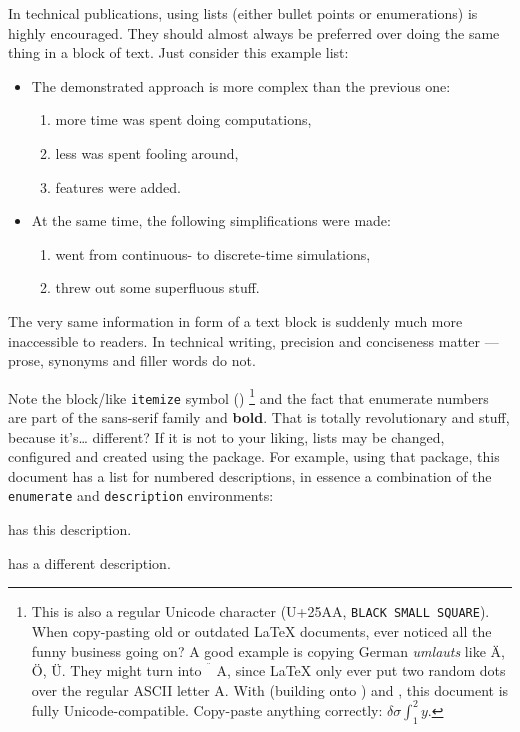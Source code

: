 In technical publications, using lists (either bullet points or enumerations)
is highly encouraged.
They should almost always be preferred over doing the same thing in a block of text.
Just consider this example list:
\begin{itemize}
    \item The demonstrated approach is more complex than the previous one:
          \begin{enumerate}
              \item more time was spent doing computations,
              \item less was spent fooling around,
              \item features were added.
          \end{enumerate}
    \item At the same time, the following simplifications were made:
          \begin{enumerate}
              \item went from continuous- to discrete-time simulations,
              \item threw out some superfluous stuff.
          \end{enumerate}
\end{itemize}
The very same information in form of a text block is suddenly much more inaccessible
to readers.
In technical writing, precision and conciseness matter --- prose, synonyms and
filler words do not.

Note the block\-/like \texttt{itemize} symbol (\raisebox{0.2ex}{\rule{0.7ex}{0.7ex}})%
\footnote{%
    This is also a regular Unicode character (U+25AA, \texttt{BLACK SMALL SQUARE}).
    When copy-pasting old or outdated \LaTeX{} documents, ever noticed all the
    funny business going on?
    A good example is copying German \emph{umlauts} like Ä, Ö, Ü.
    They might turn into \emph{\(\ddot{\phantom{A}}\text{A}\)}, since \LaTeX{}
    only ever put two random dots over the regular ASCII letter A.
    With  (building onto ) and
    , this document is fully Unicode-compatible.
    Copy-paste anything correctly: \(\delta \sigma \int_{1}^{2} y\).
}
and the fact that enumerate numbers are part of the {\sffamily sans-serif family}
and \textbf{bold}.
That is totally revolutionary and stuff, because it's\dots{} different?
If it is not to your liking, lists may be changed, configured and created using the
 package.
For example, using that package, this document has a list for numbered descriptions,
in essence a combination of the \verb|enumerate| and \verb|description| environments:
\begin{enumdescript}
    \item[This item] has this description.
    \item[This other item] has a different description.
\end{enumdescript}

